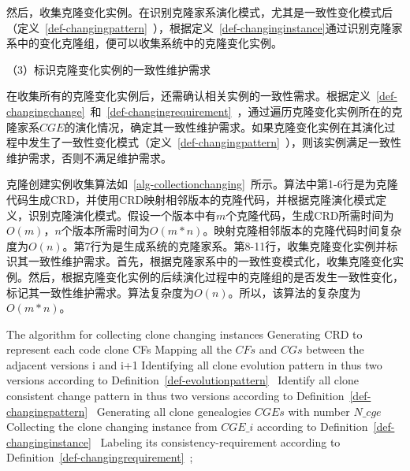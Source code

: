 然后，收集克隆变化实例。在识别克隆家系演化模式，尤其是一致性变化模式后（定义~\ref{def-changingpattern}~），根据定义~\ref{def-changinginstance}通过识别克隆家系中的变化克隆组，便可以收集系统中的克隆变化实例。

（3）标识克隆变化实例的一致性维护需求

在收集所有的克隆变化实例后，还需确认相关实例的一致性需求。根据定义~\ref{def-changingchange}~和~\ref{def-changingrequirement}~，通过遍历克隆变化实例所在的克隆家系$CGE$的演化情况，确定其一致性维护需求。如果克隆变化实例在其演化过程中发生了一致性变化模式（定义~\ref{def-changingpattern}~），则该实例满足一致性维护需求，否则不满足维护需求。

克隆创建实例收集算法如~\ref{alg-collectionchanging}~所示。算法中第1-6行是为克隆代码生成CRD，并使用CRD映射相邻版本的克隆代码，并根据克隆演化模式定义，识别克隆演化模式。假设一个版本中有$m$个克隆代码，生成CRD所需时间为$O(m)$，$n$个版本所需时间为$O(m*n)$。映射克隆相邻版本的克隆代码时间复杂度为$O(n)$。第7行为是生成系统的克隆家系。第8-11行，收集克隆变化实例并标识其一致性维护需求。首先，根据克隆家系中的一致性变模式化，收集克隆变化实例。然后，根据克隆变化实例的后续演化过程中的克隆组的是否发生一致性变化，标记其一致性维护需求。算法复杂度为$O(n)$。所以，该算法的复杂度为$O(m*n)$。

\vspace{1em}
\begin{minipage}{0.8\textwidth}
\centering
\begin{algorithm}[H]
 {The algorithm for collecting clone changing instances}
\label{alg-collectionchanging}
{ 
 Generating CRD to represent each code clone {CFs}\;
 Mapping all the $CFs$ and $CGs$ between the adjacent versions {i} and {i+1}\;
 Identifying all clone evolution pattern in thus two versions according to Definition~\ref{def-evolutionpattern}~\;
 Identify all clone consistent change pattern in thus two versions according to Definition~\ref{def-changingpattern}~\;
}
Generating all clone genealogies $CGEs$ with number $N\_cge$\;
{ 
 Collecting the clone changing instance from $CGE\_i$ according to Definition~\ref{def-changinginstance}~\; 
 Labeling its consistency-requirement according to Definition~\ref{def-changingrequirement}~;
}
\end{algorithm}
\end{minipage}

